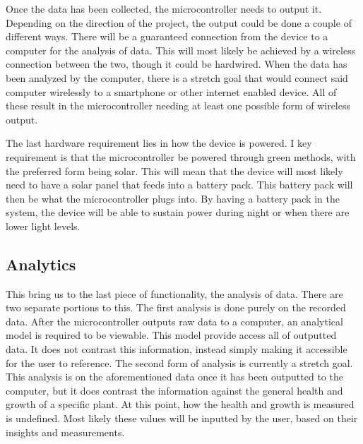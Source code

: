 \documentclass[IEEEtran,letterpaper,10pt,titlepage,fleqn,draftclsnofoot,onecolumn]{article}
\begin{document}
\vspace{5mm}

Once the data has been collected, the microcontroller needs to output it. Depending on the direction of the project, the output could be done a couple of different ways. There will be a guaranteed connection from the device to a computer for the analysis of data. This will most likely be achieved by a wireless connection between the two, though it could be hardwired. When the data has been analyzed by the computer, there is a stretch goal that would connect said computer wirelessly to a smartphone or other internet enabled device. All of these result in the microcontroller needing at least one possible form of wireless output.

\vspace{5mm}

The last hardware requirement lies in how the device is powered. I key requirement is that the microcontroller be powered through green methods, with the preferred form being solar. This will mean that the device will most likely need to have a solar panel that feeds into a battery pack. This battery pack will then be what the microcontroller plugs into. By having a battery pack in the system, the device will be able to sustain power during night or when there are lower light levels.

\clearpage

\subsection{Analytics}

This bring us to the last piece of functionality, the analysis of data. There are two separate portions to this. The first analysis is done purely on the recorded data. After the microcontroller outputs raw data to a computer, an analytical model is required to be viewable. This model provide access all of outputted data. It does not contrast this information, instead simply making it accessible for the user to reference. The second form of analysis is currently a stretch goal. This analysis is on the aforementioned data once it has been outputted to the computer, but it does contrast the information against the general health and growth of a specific plant. At this point, how the health and growth is measured is undefined. Most likely these values will be inputted by the user, based on their insights and measurements.

\vspace{5mm}
\end{document}
